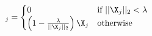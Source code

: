 \documentclass[preview,border=0.3pt]{standalone}
\begin{document}
%
\begin{equation*}
[\mathrm{prox}_{g}(\X)]_j = 
    \begin{cases}
        0&\text{if}\ ||\X_j||_2 < \lambda\\
        \left(1-\frac{\lambda}{||\X_j||_2}\right)\X_j&\text{otherwise}\\
    \end{cases}\label{}
\end{equation*}
\end{document}
